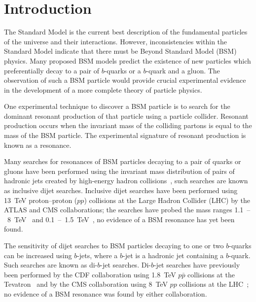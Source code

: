 \chapter{Introduction}
\label{sec:int}
The Standard Model is the current best description of the fundamental particles of the universe and their interactions.
However, inconsistencies within the Standard Model indicate that
there must be Beyond Standard Model (BSM) physics.
Many proposed BSM models predict the existence of new particles
which preferentially decay to a pair of $b$-quarks or a $b$-quark and a gluon.
The observation of such a BSM particle would provide crucial experimental
evidence in the development of a more complete theory of particle physics.


One experimental technique to discover a BSM particle is to search for
the dominant resonant production of that particle using a particle collider.
Resonant production occurs when the invariant mass of the colliding partons is equal to the mass of the BSM particle.
The experimental signature of resonant production is known as a resonance.

Many searches for resonances of BSM particles decaying to a pair of quarks or gluons
have been performed using the invariant mass distribution of pairs of hadronic jets created
by high-energy hadron collisions~\cite{theo-dijet_harris}, such searches are known as inclusive dijet searches.
Inclusive dijet searches have been performed using 13~TeV \mbox{proton--proton} ($pp$) collisions at the
Large Hadron Collider (LHC) by the ATLAS and CMS collaborations;
the searches have probed the mass ranges 1.1~--~8~TeV~\cite{dijet-mori16_paper,dijet-mori17_paper,dijet-cms}
and 0.1~--~1.5~TeV~\cite{dijet-isr,dijet-TLA,dijet-isr_cms},
no evidence of a BSM resonance has yet been found.

The sensitivity of dijet searches to BSM particles decaying to one or two $b$-quarks can be increased
using $b$-jets, where a $b$-jet is a hadronic jet containing a $b$-quark.
Such searches are known as di-$b$-jet searches.
Di-$b$-jet searches have previously been performed by
the CDF collaboration using 1.8~TeV $p\bar{p}$ collisions at the Tevatron~\cite{dibjet-cdf}
and by the CMS collaboration using 8~TeV $pp$ collisions at the LHC~\cite{dibjet-cms};
no evidence of a BSM resonance was found by either collaboration.

